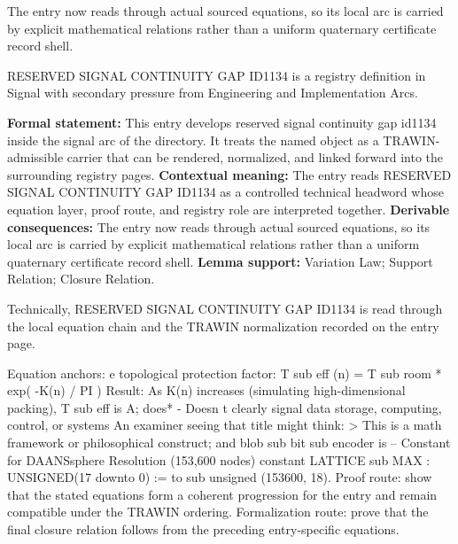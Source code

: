 The entry now reads through actual sourced equations, so its local arc is carried by explicit mathematical relations rather than a uniform quaternary certificate record shell.
\clearpage


\begingroup\small
{}
RESERVED SIGNAL CONTINUITY GAP ID1134 is a registry definition in Signal with secondary pressure from Engineering and Implementation Arcs.

\begingroup\footnotesize\setlength{\emergencystretch}{3em}\sloppy
\textbf{Formal statement:} This entry develops reserved signal continuity gap id1134 inside the signal arc of the directory. It treats the named object as a TRAWIN-admissible carrier that can be rendered, normalized, and linked forward into the surrounding registry pages. \textbf{Contextual meaning:} The entry reads RESERVED SIGNAL CONTINUITY GAP ID1134 as a controlled technical headword whose equation layer, proof route, and registry role are interpreted together. \textbf{Derivable consequences:} The entry now reads through actual sourced equations, so its local arc is carried by explicit mathematical relations rather than a uniform quaternary certificate record shell. \textbf{Lemma support:} Variation Law; Support Relation; Closure Relation.\par
\endgroup

Technically, RESERVED SIGNAL CONTINUITY GAP ID1134 is read through the local equation chain and the TRAWIN normalization recorded on the entry page.

Equation anchors: e topological protection factor: T sub eff (n) = T sub room * exp( -K(n) / PI ) Result: As K(n) increases (simulating high-dimensional packing), T sub eff is A; does* -   Doesn t clearly signal data storage, computing, control, or systems An examiner seeing that title might think: > This is a math framework or philosophical construct; and blob sub bit sub encoder is -- Constant for DAANSsphere Resolution (153,600 nodes) constant LATTICE sub MAX : UNSIGNED(17 downto 0) := to sub unsigned (153600, 18). Proof route: show that the stated equations form a coherent progression for the entry and remain compatible under the TRAWIN ordering. Formalization route: prove that the final closure relation follows from the preceding entry-specific equations.

